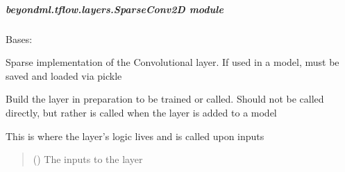 \documentclass[letterpaper,10pt,english]{sphinxmanual}
\begin{document}
\subparagraph{beyondml.tflow.layers.SparseConv2D module}
\label{\detokenize{beyondml.tflow.layers:module-beyondml.tflow.layers.SparseConv2D}}\label{\detokenize{beyondml.tflow.layers:beyondml-tflow-layers-sparseconv2d-module}}

\begin{fulllineitems}
\label{\detokenize{beyondml.tflow.layers:beyondml.tflow.layers.SparseConv2D.SparseConv2D}}
\pysigstartsignatures
{}
\pysigstopsignatures
\sphinxAtStartPar
Bases: 

\sphinxAtStartPar
Sparse implementation of the Convolutional layer. If used in a model,
must be saved and loaded via pickle

\begin{fulllineitems}
\label{\detokenize{beyondml.tflow.layers:beyondml.tflow.layers.SparseConv2D.SparseConv2D.build}}
\pysigstartsignatures
{}
\pysigstopsignatures
\sphinxAtStartPar
Build the layer in preparation to be trained or called. Should not be called directly,
but rather is called when the layer is added to a model

\end{fulllineitems}


\begin{fulllineitems}
\label{\detokenize{beyondml.tflow.layers:beyondml.tflow.layers.SparseConv2D.SparseConv2D.call}}
\pysigstartsignatures
{}
\pysigstopsignatures
\sphinxAtStartPar
This is where the layer’s logic lives and is called upon inputs
\begin{quote}\begin{description}
\sphinxAtStartPar
{} () \textendash{} The inputs to the layer


\end{description}
\end{quote}
\end{fulllineitems}
\end{fulllineitems}
\end{document}
